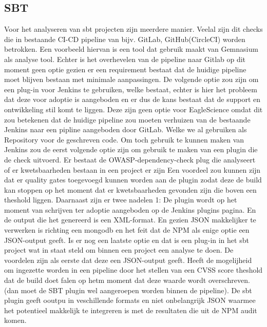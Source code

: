 \subsection{SBT}\label{subsec:sbt}
Voor het analyseren van sbt projecten zijn meerdere manier. Veelal zijn dit checks die in bestaande CI-CD pipeline van bijv. GitLab, GitHub(CircleCI) worden betrokken. Een voorbeeld hiervan is een tool dat gebruik maakt van Gemnasium als analyse tool. Echter is het overhevelen van de pipeline naar Gitlab op dit moment geen optie gezien er een requirement bestaat dat de huidige pipeline moet blijven bestaan met minimale aanpassingen. De volgende optie zou zijn om een plug-in voor Jenkins te gebruiken, welke bestaat, echter is hier het probleem dat deze voor adoptie is aangeboden en er dus de kans bestaat dat de support en ontwikkeling stil komt te liggen. Deze zijn geen optie voor EagleScience omdat dit zou betekenen dat de huidige pipeline zou moeten verhuizen van de bestaande Jenkins naar een pipline aangeboden door GitLab. Welke we al gebruiken als Repository voor de geschreven code. Om toch gebruik te kunnen maken van Jenkins zou de eerst volgende optie zijn om gebruik te maken van een plugin die de check uitvoerd. Er bestaat de OWASP-dependency-check plug die analyseert of er kwetsbaarheden bestaan in een project er zijn Een voordeel zou kunnen zijn dat er quality gates toegevoegd kunnen worden aan de plugin zodat deze de build kan stoppen op het moment dat er kwetsbaarheden gevonden zijn die boven een theshold liggen. Daarnaast zijn er twee nadelen 1: De plugin wordt op het moment van schrijven ter adoptie aangeboden op de Jenkins plugins pagina. En de output die het genereerd is een XML-format. En gezien JSON makkelijker te verwerken is richting een mongodb en het feit dat de NPM als enige optie een JSON-output geeft. Is er nog een laatste optie en dat is een plug-in in het sbt project wat in staat steld om binnen een project een analyse te doen. De voordelen zijn als eerste dat deze een JSON-output geeft. Heeft de mogelijheid om ingezette worden in een pipeline door het stellen van een CVSS score theshold dat de build doet falen op hetm moment dat deze waarde wordt overschreven. (dan moet de SBT plugin wel aangeroepen worden binnen de pipeline). De sbt plugin geeft ooutpu in veschillende formats en niet onbelangrijk JSON waarmee het potentieel makkelijk te integreren is met de resultaten die uit de NPM audit komen.


